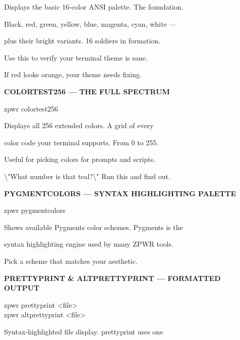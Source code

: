 \documentclass[11pt,a4paper,twoside]{book}
\begin{document}
Displays the basic 16-color ANSI palette. The foundation.

Black, red, green, yellow, blue, magenta, cyan, white —

plus their bright variants. 16 soldiers in formation.

Use this to verify your terminal theme is sane.

If red looks orange, your theme needs fixing.


\vspace{12pt}
{\bfseries\color{neonyellow} COLORTEST256 — THE FULL SPECTRUM}\vspace{4pt}

\begin{codebox}
zpwr colortest256\\
\end{codebox}

Displays all 256 extended colors. A grid of every

color code your terminal supports. From 0 to 255.

Useful for picking colors for prompts and scripts.

\textbackslash{}"What number is that teal?\textbackslash{}" Run this and find out.


\vspace{12pt}
{\bfseries\color{neonyellow} PYGMENTCOLORS — SYNTAX HIGHLIGHTING PALETTE}\vspace{4pt}

\begin{codebox}
zpwr pygmentcolors\\
\end{codebox}

Shows available Pygments color schemes. Pygments is the

syntax highlighting engine used by many ZPWR tools.

Pick a scheme that matches your aesthetic.


\vspace{12pt}
{\bfseries\color{neonyellow} PRETTYPRINT \& ALTPRETTYPRINT — FORMATTED OUTPUT}\vspace{4pt}

\begin{codebox}
zpwr prettyprint <file>\\
zpwr altprettyprint <file>\\
\end{codebox}

Syntax-highlighted file display. prettyprint uses one
\end{document}
